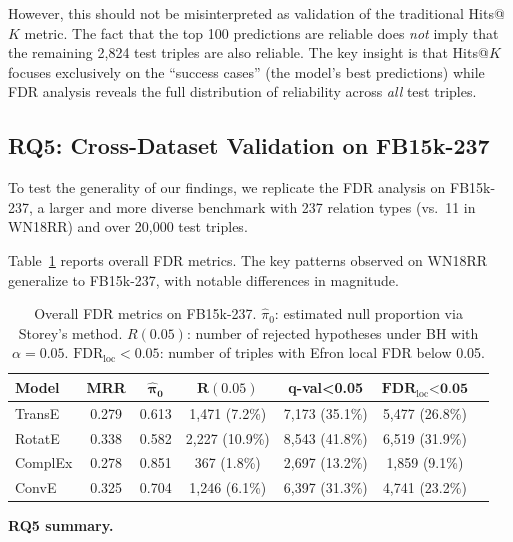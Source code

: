 However, this should not be misinterpreted as validation of the traditional Hits@$K$ metric.
The fact that the top 100 predictions are reliable does \emph{not} imply that the remaining 2,824 test triples are also reliable.
The key insight is that Hits@$K$ focuses exclusively on the ``success cases'' (the model's best predictions) while FDR analysis reveals the full distribution of reliability across \emph{all} test triples.

\subsection{RQ5: Cross-Dataset Validation on FB15k-237}
\label{subsec:fb15k}

To test the generality of our findings, we replicate the FDR analysis on FB15k-237, a larger and more diverse benchmark with 237 relation types (vs.\ 11 in WN18RR) and over 20,000 test triples.

Table~\ref{tab:fdr-fb15k} reports overall FDR metrics. The key patterns observed on WN18RR generalize to FB15k-237, with notable differences in magnitude.

\begin{table}[t]
\centering
\caption{Overall FDR metrics on FB15k-237. $\hat{\pi}_0$: estimated null proportion via Storey's method. $R(0.05)$: number of rejected hypotheses under BH with $\alpha = 0.05$. $\text{FDR}_{\text{loc}}<0.05$: number of triples with Efron local FDR below 0.05.}
\label{tab:fdr-fb15k}
\begin{tabular}{lcccccc}
\toprule
\textbf{Model} & \textbf{MRR} & $\boldsymbol{\hat{\pi}_0}$ & $\boldsymbol{R(0.05)}$ & \textbf{q-val<0.05} & $\textbf{FDR}_{\text{loc}}\textbf{<0.05}$ \\
\midrule
TransE & 0.279 & 0.613 & 1,471 (7.2\%) & 7,173 (35.1\%) & 5,477 (26.8\%) \\
RotatE & 0.338 & 0.582 & 2,227 (10.9\%) & 8,543 (41.8\%) & 6,519 (31.9\%) \\
ComplEx & 0.278 & 0.851 & 367 (1.8\%) & 2,697 (13.2\%) & 1,859 (9.1\%) \\
ConvE & 0.325 & 0.704 & 1,246 (6.1\%) & 6,397 (31.3\%) & 4,741 (23.2\%) \\
\bottomrule
\end{tabular}
\end{table}

\textbf{RQ5 summary.}

